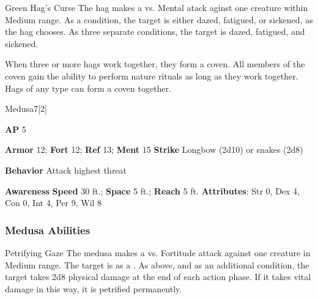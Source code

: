 \vspace{0.5em}
\begin{freeability}{Green Hag's Curse}
The hag makes a  vs. Mental atack aginst one creature within Medium range.
\hit As a condition, the target is either dazed, fatigued, or sickened, as the hag chooses.
\crit As three separate conditions, the target is dazed, fatigued, and sickened.
\end{freeability}

When three or more hags work together, they form a coven.
All members of the coven gain the ability to perform nature rituals as long as they work together.
Hags of any type can form a coven together.

\begin{monsection}{Medusa}{7}[2]
\vspace{-1em}\vspace{-1em}
\begin{spellcontent}
\begin{spelltargetinginfo}
{\textbf{AP} 5}

\pari \textbf{Armor} 12;
\textbf{Fort} 12;
\textbf{Ref} 13;
\textbf{Ment} 15
\pari \textbf{Strike} Longbow  (2d10) or snakes  (2d8)



\pari \textbf{Behavior} Attack highest threat
\end{spelltargetinginfo}
\end{spellcontent}

\begin{monsterfooter}
\pari \textbf{Awareness} 
\pari \textbf{Speed} 30 ft.;
\textbf{Space} 5 ft.;
\textbf{Reach} 5 ft.
\pari \textbf{Attributes}:
Str 0,
Dex 4,
Con 0,
Int 4,
Per 9,
Wil 8
\end{monsterfooter}
\end{monsection}


\subsubsection{Medusa Abilities}

\begin{freeability}{Petrifying Gaze}
The medusa makes a  vs. Fortitude attack against one creature in Medium range.
\hit The target is  as a .
\crit As above, and as an additional condition, the target takes 2d8 physical damage at the end of each action phase.
If it takes vital damage in this way, it is petrified permanently.
\end{freeability}

